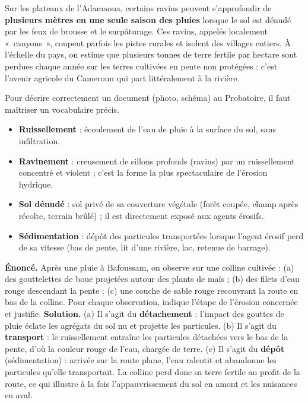 \documentclass[11pt]{article}
\newcounter{popsec}
\newcounter{popsub}
\newcommand{\courssub}[1]{%
  \stepcounter{popsub}%
  \par\vspace{9pt}\noindent{\popxbold\fontsize{11.5}{13}\selectfont\color{popink}{\color{poporange}\thepopsec.\thepopsub}\hspace{6pt}#1}\par\nopagebreak\vspace{4pt}
}
\begin{document}
\begin{savaistu}
Sur les plateaux de l'Adamaoua, certains ravins peuvent s'approfondir de \textbf{plusieurs mètres en une seule saison des pluies} lorsque le sol est dénudé par les feux de brousse et le surpâturage. Ces ravins, appelés localement «~canyons~», coupent parfois les pistes rurales et isolent des villages entiers. À l'échelle du pays, on estime que plusieurs tonnes de terre fertile par hectare sont perdues chaque année sur les terres cultivées en pente non protégées : c'est l'avenir agricole du Cameroun qui part littéralement à la rivière.
\end{savaistu}

\courssub{Le vocabulaire de l'érosion}

Pour décrire correctement un document (photo, schéma) au Probatoire, il faut maîtriser un vocabulaire précis.

\begin{definition}
\begin{itemize}
\item \textbf{Ruissellement} : écoulement de l'eau de pluie à la surface du sol, sans infiltration.
\item \textbf{Ravinement} : creusement de sillons profonds (ravins) par un ruissellement concentré et violent ; c'est la forme la plus spectaculaire de l'érosion hydrique.
\item \textbf{Sol dénudé} : sol privé de sa couverture végétale (forêt coupée, champ après récolte, terrain brûlé) ; il est directement exposé aux agents érosifs.
\item \textbf{Sédimentation} : dépôt des particules transportées lorsque l'agent érosif perd de sa vitesse (bas de pente, lit d'une rivière, lac, retenue de barrage).
\end{itemize}
\end{definition}

\begin{exoresolu}
\textbf{Énoncé.} Après une pluie à Bafoussam, on observe sur une colline cultivée : (a) des gouttelettes de boue projetées autour des plants de maïs ; (b) des filets d'eau rouge descendant la pente ; (c) une couche de sable rouge recouvrant la route en bas de la colline. Pour chaque observation, indique l'étape de l'érosion concernée et justifie.
\tcblower
\textbf{Solution.} (a) Il s'agit du \textbf{détachement} : l'impact des gouttes de pluie éclate les agrégats du sol nu et projette les particules. (b) Il s'agit du \textbf{transport} : le ruissellement entraîne les particules détachées vers le bas de la pente, d'où la couleur rouge de l'eau, chargée de terre. (c) Il s'agit du \textbf{dépôt} (sédimentation) : arrivée sur la route plane, l'eau ralentit et abandonne les particules qu'elle transportait. La colline perd donc sa terre fertile au profit de la route, ce qui illustre à la fois l'appauvrissement du sol en amont et les nuisances en aval.
\end{exoresolu}
\end{document}
